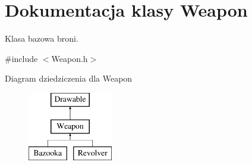 \hypertarget{class_weapon}{}\section{Dokumentacja klasy Weapon}
\label{class_weapon}


Klasa bazowa broni.  




{\ttfamily \#include $<$Weapon.\+h$>$}

Diagram dziedziczenia dla Weapon\begin{figure}[H]
\begin{center}
\leavevmode
\includegraphics[height=3.000000cm]{class_weapon}
\end{center}
\end{figure}
